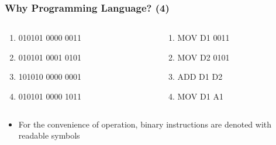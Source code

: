 \begin{frame}
	\frametitle{Why Programming Language? (4)}
\begin{columns}
\begin{column}{0.45\linewidth}
\begin{enumerate}
	\item {010101 0000 0011}
	\item {010101 0001 0101}
	\item {101010 0000 0001}
	\item {010101 0000 1011}
\end{enumerate}
\end{column}
\begin{column}{0.45\linewidth}
\vspace{-0.1in}
\begin{enumerate}
	\item {MOV D1 0011}
	\item {MOV D2 0101}
	\item {ADD D1 D2}
	\item {MOV D1 A1}
\end{enumerate}
\end{column}
\end{columns}
\vspace{0.2in}
\begin{itemize}
	\item {For the convenience of operation, binary instructions are denoted with readable symbols}
\end{itemize}

\end{frame}

